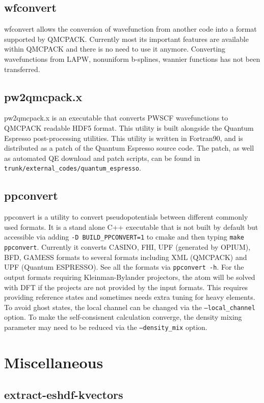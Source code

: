   \subsection{wfconvert}
    wfconvert allows the conversion of wavefunction from another code into a format supported by QMCPACK.
    Currently most its important features are available within QMCPACK and there is no need to use it anymore.
    Converting wavefunctions from LAPW, nonuniform b-splines, wannier functions has not been transferred.
  \subsection{pw2qmcpack.x}
    pw2qmcpack.x is an executable that converts PWSCF wavefunctions to QMCPACK readable 
    HDF5 format.  This utility is built alongside the Quantum Espresso post-processing utilities.
    This utility is written in Fortran90, and is distributed as a patch of the Quantum Espresso 
    source code.  The patch, as well as automated QE download and patch scripts, can be found in 
    \texttt{trunk/external\_codes/quantum\_espresso}.
  \subsection{ppconvert}
    ppconvert is a utility to convert pseudopotentials between different commonly used formats.
    It is a stand alone C++ executable that is not built by default but accessible via adding
    \texttt{-D BUILD\_PPCONVERT=1} to cmake and then typing \texttt{make ppconvert}.
    Currently it converts CASINO, FHI, UPF (generated by OPIUM), BFD, GAMESS formats to several formats
    including XML (QMCPACK) and UPF (Quantum ESPRESSO). See all the formats via \texttt{ppconvert -h}.
    For the output formats requiring Kleinman-Bylander projectors, the atom will be solved with DFT
    if the projects are not provided by the input formats.
    This requires providing reference states and sometimes needs extra tuning for heavy elements.
    To avoid ghost states, the local channel can be changed via the \texttt{--local\_channel} option.
    To make the self-consisnent calculation converge, the density mixing parameter may need to be reduced
    via the \texttt{--density\_mix} option.

\section{Miscellaneous}
  \subsection{extract-eshdf-kvectors}
    

